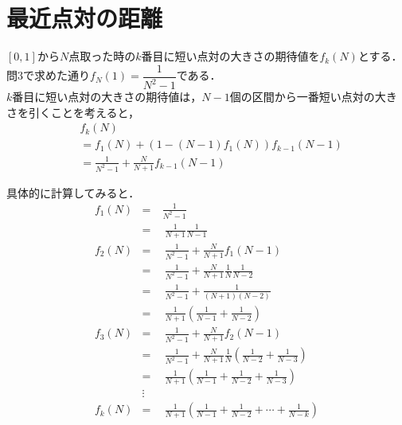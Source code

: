 \section{最近点対の距離}
$[0,1]$から$N$点取った時の$k$番目に短い点対の大きさの期待値を$f_k(N)$とする．
問3で求めた通り$f_N(1) = \dfrac{1}{N^2-1}$である．\\
$k$番目に短い点対の大きさの期待値は，$N-1$個の区間から一番短い点対の大きさを引くことを考えると，
\begin{align*}
  &f_k(N)\\
  &= f_1(N) + (1 - (N-1)f_1(N))f_{k-1}(N-1)\\
  &= \frac{1}{N^2-1} + \frac{N}{N+1}f_{k-1}(N-1)
\end{align*}

具体的に計算してみると．
\begin{align*}
  & f_1(N) &=\ & \frac{1}{N^2-1} &\\
  & &=&\  \frac{1}{N+1}\frac{1}{N-1} &\\
  & f_2(N) &=&\  \frac{1}{N^2-1} + \frac{N}{N+1}f_1(N-1) &\\
  &  &=&\  \frac{1}{N^2-1} + \frac{N}{N+1}\frac{1}{N}\frac{1}{N-2}&\\
  &  &=&\  \frac{1}{N^2-1} + \frac{1}{(N+1)(N-2)}&\\
  &  &=&\  \frac{1}{N+1}\left(\frac{1}{N-1} + \frac{1}{N-2}\right)&\\
  & f_3(N) &=&\  \frac{1}{N^2-1} + \frac{N}{N+1}f_2(N-1)&\\
  &  &=&\  \frac{1}{N^2-1} + \frac{N}{N+1}\frac{1}{N}\left(\frac{1}{N-2} + \frac{1}{N-3}\right)&\\
  &  &=&\  \frac{1}{N+1}\left(\frac{1}{N-1} + \frac{1}{N-2} + \frac{1}{N-3} \right)&\\
  & &\vdots&&\\
  & f_k(N) &=&\  \frac{1}{N+1} \left( \frac{1}{N-1} + \frac{1}{N-2} + \cdots + \frac{1}{N-k} \right)&
\end{align*}

